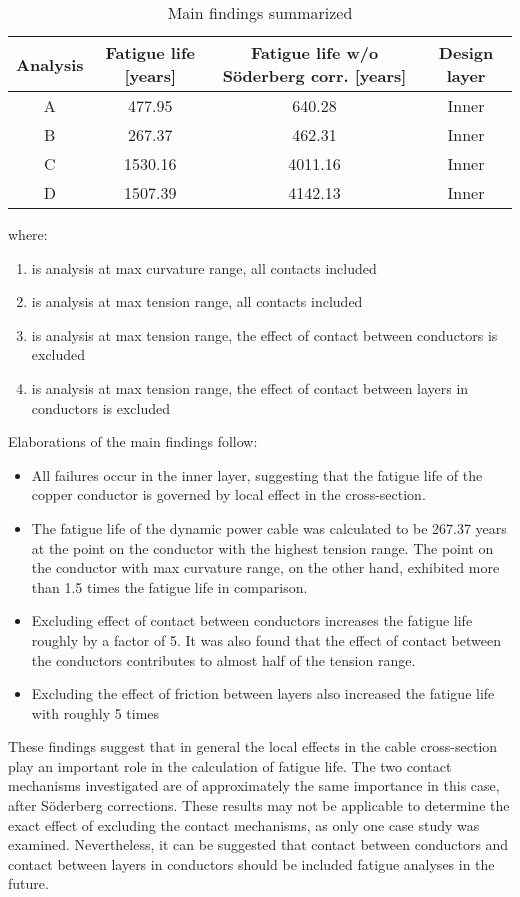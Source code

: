 \begin{table} [H]
\centering
\begin{tabular}{ |c|c|c|c|}
\hline
Analysis & Fatigue life [years] & Fatigue life w/o Söderberg corr. [years] & Design layer \\
 \hline
 \hline
 A & 477.95 & 640.28 & Inner\\
 B & 267.37 &462.31 & Inner\\
 C & 1530.16 & 4011.16 &Inner\\
 D &1507.39  &4142.13 &Inner\\
 \hline
\end{tabular}
\caption{Main findings summarized}
\label{table:mainfind}
\end{table} 
where:
\begin{enumerate}[label=\Alph*]
\item  is analysis at max curvature range, all contacts included
\item is analysis at max tension range, all contacts included
\item is analysis at max tension range, the effect of contact between conductors is excluded
\item is analysis at max tension range, the effect of contact between layers in conductors is excluded
\end{enumerate}
Elaborations of the main findings follow:
\begin{itemize}
\item All failures occur in the inner layer, suggesting that the fatigue life of the copper conductor is governed by local effect in the cross-section.
    \item The fatigue life of the dynamic power cable was calculated to be 267.37 years at the point on the conductor with the highest tension range. The point on the conductor with max curvature range, on the other hand, exhibited more than 1.5 times the fatigue life in comparison.
    \item Excluding effect of contact between conductors increases the fatigue life roughly by a factor of 5. It was also found that the effect of contact between the conductors contributes to almost half of the tension range. 
    \item Excluding the effect of friction between layers also increased the fatigue life with roughly 5 times
\end{itemize}
These findings suggest that in general the local effects in the cable cross-section play an important role in the calculation of fatigue life. The two contact mechanisms investigated are of approximately the same importance in this case, after Söderberg corrections. These results may not be applicable to determine the exact effect of excluding the contact mechanisms,  as only one case study was examined. Nevertheless, it can be suggested that contact between conductors and contact between layers in conductors should be included fatigue analyses in the future. 


